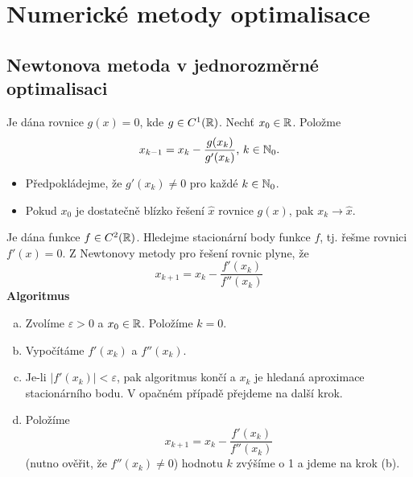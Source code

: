 \section{Numerické metody optimalisace}

\subsection{Newtonova metoda v jednorozměrné optimalisaci}
Je dána rovnice $g(x) = 0$, kde $g \in C^1(\mathbb{R})$. Nechť $x_0 \in \mathbb{R}$. Položme
\[
    x_{k-1} = x_k - \frac{g(x_k)}{g'(x_k)}\text{, } k \in \mathbb{N}_0.
\]

\begin{itemize}
    \item Předpokládejme, že $g'(x_k) \not=0$ pro každé $k \in \mathbb{N}_0$.
    \item Pokud $x_0$ je dostatečně blízko řešení $\hat x$ rovnice $g(x)$, pak $x_k \rightarrow \hat x$.
\end{itemize}
Je dána funkce $f \in C^2(\mathbb{R})$. Hledejme stacionární body funkce $f$, tj. řešme rovnici $f'(x) = 0$. Z Newtonovy metody 
pro řešení rovnic plyne, že
\[
    x_{k+1} = x_k - \frac{f'(x_k)}{f''(x_k)}
\]
\textbf{Algoritmus}
\begin{enumerate}[(a)]
    \item Zvolíme $\varepsilon > 0$ a $x_0 \in \mathbb{R}$. Položíme $k = 0$.
    \item Vypočítáme $f'(x_k)$ a $f''(x_k)$.
    \item Je-li $|f'(x_k)| < \varepsilon$, pak algoritmus končí a $x_k$ je hledaná aproximace stacionárního bodu. V 
    opačném případě přejdeme na další krok.
    \item Položíme
    \[
        x_{k+1} = x_k - \frac{f'(x_k)}{f''(x_k)}
    \]
    (nutno ověřit, že $f''(x_k) \not= 0$) hodnotu $k$ zvýšíme o 1 a jdeme na krok (b).
\end{enumerate}
